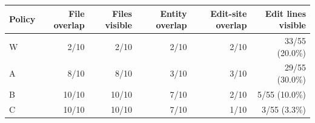 \begin{tabular}{lrrrrr}
\toprule
Policy & File overlap & Files visible & Entity overlap & Edit-site overlap & Edit lines visible \\
\midrule
W & 2/10 & 2/10 & 2/10 & 2/10 & 33/55 (20.0\%) \\
A & 8/10 & 8/10 & 3/10 & 3/10 & 29/55 (30.0\%) \\
B & 10/10 & 10/10 & 7/10 & 2/10 & 5/55 (10.0\%) \\
C & 10/10 & 10/10 & 7/10 & 1/10 & 3/55 (3.3\%) \\
\bottomrule
\end{tabular}
